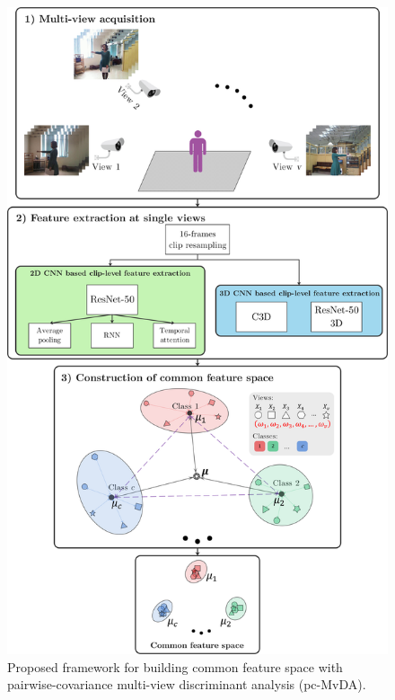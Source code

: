     \begin{figure}[htbp]
        \centering
        \includegraphics[width=0.82\linewidth]{figs/Framework.png}
        \caption{Proposed framework for building common feature space with pairwise-covariance multi-view discriminant analysis (pc-MvDA).}
        \label{fig:frw}
    \end{figure}
